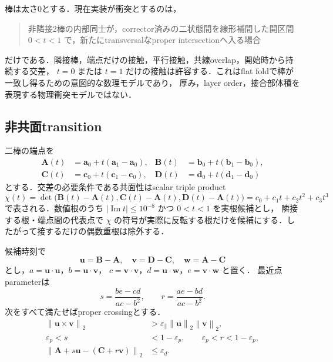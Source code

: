 \documentclass[a4paper,11pt]{ltjsarticle}
\newcommand{\norm}[1]{\left\lVert #1\right\rVert}
\newcommand{\abs}[1]{\left\lvert #1\right\rvert}
\begin{document}
棒は太さ0とする．現在実装が衝突とするのは，
\begin{quote}
非隣接2棒の内部同士が，corrector済みの二状態間を線形補間した開区間
$0<t<1$ で，新たにtransversalなproper intersectionへ入る場合
\end{quote}
だけである．隣接棒，端点だけの接触，平行接触，共線overlap，開始時から持続する交差，
$t=0$ または $t=1$ だけの接触は許容する．これはflat foldで棒が一致し得るための意図的な数理モデルであり，
厚み，layer order，接合部体積を表現する物理衝突モデルではない．

\subsection{非共面transition}

二棒の端点を
\begin{align}
 \bm A(t)&=\bm a_0+t(\bm a_1-\bm a_0),&
 \bm B(t)&=\bm b_0+t(\bm b_1-\bm b_0),\\
 \bm C(t)&=\bm c_0+t(\bm c_1-\bm c_0),&
 \bm D(t)&=\bm d_0+t(\bm d_1-\bm d_0)
\end{align}
とする．交差の必要条件である共面性はscalar triple product
\begin{equation}
 \chi(t)=\det\bigl(\bm B(t)-\bm A(t),
 \bm C(t)-\bm A(t),\bm D(t)-\bm A(t)\bigr)
 =c_0+c_1t+c_2t^2+c_3t^3
 \label{eq:coplanar-poly}
\end{equation}
で表される．数値根のうち
$\abs{\operatorname{Im}t}\le10^{-8}$ かつ $0<t<1$ を実根候補とし，
隣接する根・端点間の代表点で
$\chi$ の符号が実際に反転する根だけを候補にする．したがって接するだけの偶数重根は除外する．

候補時刻で
\begin{equation}
 \bm u=\bm B-\bm A,\quad \bm v=\bm D-\bm C,\quad
 \bm w=\bm A-\bm C
\end{equation}
とし，$a=\bm u\cdot\bm u$，$b=\bm u\cdot\bm v$，
$c=\bm v\cdot\bm v$，$d=\bm u\cdot\bm w$，$e=\bm v\cdot\bm w$ と置く．
最近点parameterは
\begin{equation}
 s=\frac{be-cd}{ac-b^2},\qquad
 r=\frac{ae-bd}{ac-b^2}.
\end{equation}
次をすべて満たせばproper crossingとする．
\begin{align}
 \norm{\bm u\times\bm v}_2&>\varepsilon_{\parallel}\norm{\bm u}_2\norm{\bm v}_2,\\
  \varepsilon_p<s&<1-\varepsilon_p,\qquad
 \varepsilon_p<r<1-\varepsilon_p,\\
 \norm{\bm A+s\bm u-(\bm C+r\bm v)}_2&\le\varepsilon_d.
\end{align}
\end{document}
